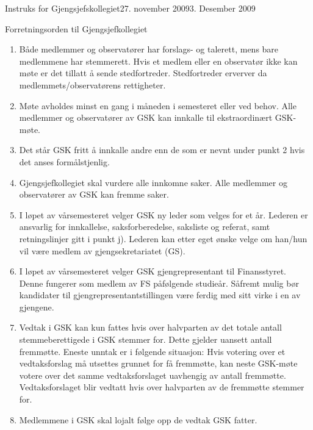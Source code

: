 \begin{instruks}{Instruks for Gjengsjefskollegiet}{27. november 2009}{3. Desember 2009}
    \begin{instruksledd}{Forretningsorden til Gjengsjefkollegiet}
        \begin{enumerate}
            \item Både medlemmer og observatører har forslags- og talerett, mens bare medlemmene
                har stemmerett. Hvis et
                medlem eller en observatør ikke kan møte er det tillatt å sende stedfortreder.
                Stedfortreder erverver da
                medlemmets/observatørens rettigheter.
            \item Møte avholdes minst en gang i måneden i semesteret eller ved behov. Alle
                medlemmer og observatører av
                GSK kan innkalle til ekstraordinært GSK-møte.
            \item Det står GSK fritt å innkalle andre enn de som er nevnt under punkt 2 hvis det
                anses formålstjenlig.
            \item Gjengsjefkollegiet skal vurdere alle innkomne saker. Alle medlemmer og
                observatører av GSK kan fremme
                saker.
            \item I løpet av vårsemesteret velger GSK ny leder som velges for et år. Lederen er
                ansvarlig for innkallelse,
                saksforberedelse, saksliste og referat, samt retningslinjer gitt i punkt j).
                Lederen kan etter eget ønske velge
                om han/hun vil være medlem av gjengsekretariatet (GS).
            \item
                I løpet av vårsemesteret velger GSK gjengrepresentant til Finansstyret. Denne
                fungerer som medlem av FS
                påfølgende studieår. Såfremt mulig bør kandidater til gjengrepresentantstillingen
                være ferdig med sitt virke i
                en av gjengene.
            \item Vedtak i GSK kan kun fattes hvis over halvparten av det totale antall
                stemmeberettigede i GSK stemmer for.
                Dette gjelder uansett antall fremmøtte. Eneste unntak er i følgende situasjon:
                Hvis votering over et
                vedtaksforslag må utsettes grunnet for få fremmøtte, kan neste GSK-møte votere
                over det samme
                vedtaksforslaget uavhengig av antall fremmøtte. Vedtaksforslaget blir vedtatt hvis
                over halvparten av de
                fremmøtte stemmer for.
            \item Medlemmene i GSK skal lojalt følge opp de vedtak GSK fatter.

\end{enumerate}
\end{instruksledd}
\end{instruks}
